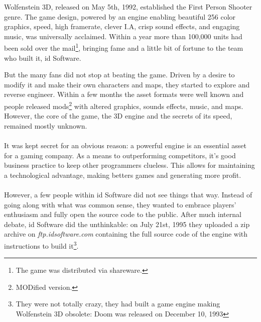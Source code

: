 Wolfenstein 3D, released on May 5th, 1992, established the First Person Shooter genre. The game design, powered by an engine enabling beautiful 256 color graphics, speed, high framerate, clever I.A, crisp sound effects, and engaging music, was universally acclaimed. Within a year more than 100,000 units had been sold over the mail\footnote{The game was distributed via shareware.}, bringing fame and a little bit of fortune to the team who built it, id Software.\\
\par
\begin{figure}[H]
\centering
{}
\end{figure}
\par
But the many fans did not stop at beating the game. Driven by a desire to modify it and make their own characters and maps, they started to explore and reverse engineer. Within a few months the asset formats were well known and people released mods\footnote{MODified version.} with altered graphics, sounds effects, music, and maps. However, the core of the game, the 3D engine and the secrets of its speed, remained mostly unknown.\\
\\
It was kept secret for an obvious reason: a powerful engine is an essential asset for a gaming company. As a means to outperforming competitors, it's good business practice to keep other programmers clueless. This allows for maintaining a technological advantage, making betters games and generating more profit.\\
\\
However, a few people within id Software did not see things that way. Instead of going along with what was common sense, they wanted to embrace players' enthusiasm and fully open the source code to the public. After much internal debate, id Software did the unthinkable: on July 21st, 1995 they uploaded a zip archive on \emph{ftp.idsoftware.com} containing the full source code of the engine with instructions to build it\footnote{They were not totally crazy, they had built a game engine making Wolfenstein 3D obsolete: Doom was released on December 10, 1993}.\\

